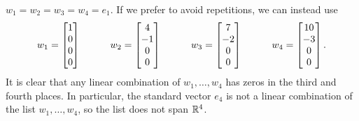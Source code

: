 \documentclass[a4paper]{amsart}
\renewenvironment{solution}{\SolutionInline}{\endSolutionInline}
\begin{document}
\begin{solution}
\begin{itemize}
   $w_1=w_2=w_3=w_4=e_1$.  If we prefer to avoid repetitions, we can
   instead use 
   \[ w_1 = \left[\begin{matrix}  1 \\  0 \\ 0 \\ 0 \end{matrix}\right] \hspace{3em} 
      w_2 = \left[\begin{matrix}  4 \\ -1 \\ 0 \\ 0 \end{matrix}\right] \hspace{3em} 
      w_3 = \left[\begin{matrix}  7 \\ -2 \\ 0 \\ 0 \end{matrix}\right] \hspace{3em} 
      w_4 = \left[\begin{matrix} 10 \\ -3 \\ 0 \\ 0 \end{matrix}\right].
   \]
   It is clear that any linear combination of $w_1,\dotsc,w_4$ has
   zeros in the third and fourth places.  In particular, the standard
   vector $e_4$ is not a linear combination of the list
   $w_1,\dotsc,w_4$, so the list does not span ${\mathbb{R}}^4$.
 \end{itemize}
\end{solution}
\end{document}

